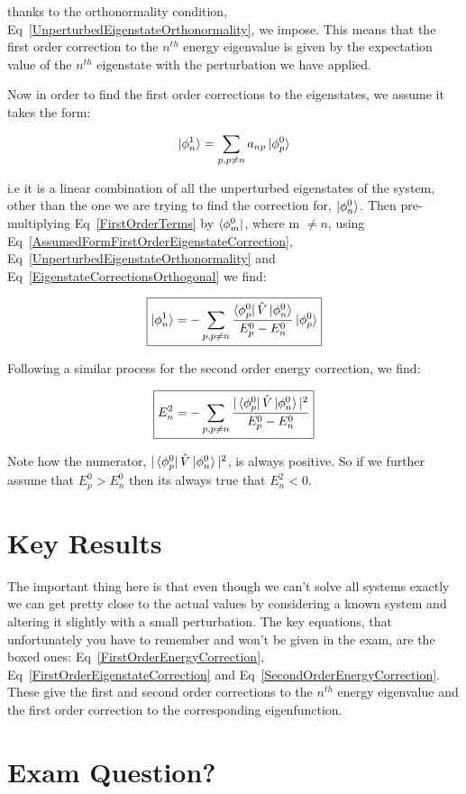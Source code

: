 \noindent thanks to the orthonormality condition, Eq~\ref{UnperturbedEigenstateOrthonormality}, we impose. This means that the first order correction to the $n^{th}$ energy eigenvalue is given by the expectation value of the $n^{th}$ eigenstate with the perturbation we have applied.

\noindent Now in order to find the first order corrections to the eigenstates, we assume it takes the form:

\begin{equation}
    \ket{\phi^1_n} = \sum_{p, p \neq n} a_{np} \ket{\phi^0_p}
    \label{AssumedFormFirstOrderEigenstateCorrection}
\end{equation}

\noindent i.e it is a linear combination of all the unperturbed eigenstates of the system, other than the one we are trying to find the correction for, $\ket{\phi^0_n}$. Then pre-multiplying Eq~\ref{FirstOrderTerms} by $\bra{\phi^0_m}$, where m $\neq n$, using Eq~\ref{AssumedFormFirstOrderEigenstateCorrection}, Eq~\ref{UnperturbedEigenstateOrthonormality} and Eq~\ref{EigenstateCorrectionsOrthogonal} we find:

\begin{equation}
    \boxed{\ket{\phi^1_n} = - \sum_{p, p \neq n} \frac{\bra{\phi^0_p}  \Hat{V}  \ket{\phi^0_n}}{{E^0_p - E^0_n}} \ket{\phi^0_p}}
    \label{FirstOrderEigenstateCorrection}
\end{equation}

\noindent Following a similar process for the second order energy correction, we find:

\begin{equation}
    \boxed{E^2_n = - \sum_{p, p \neq n} \frac{|\bra{\phi^0_p}  \Hat{V}  \ket{\phi^0_n}|^2}{{E^0_p - E^0_n}}}
    \label{SecondOrderEnergyCorrection}
\end{equation}

\noindent Note how the numerator, $|\bra{\phi^0_p}  \Hat{V}  \ket{\phi^0_n}|^2$, is always positive. So if we further assume that $E^0_p > E^0_n$ then its always true that $E^2_n < 0$.

\section{Key Results}

The important thing here is that even though we can't solve all systems exactly we can get pretty close to the actual values by considering a known system and altering it slightly with a small perturbation. The key equations, that unfortunately you have to remember and won't be given in the exam, are the boxed ones: Eq~\ref{FirstOrderEnergyCorrection}, Eq~\ref{FirstOrderEigenstateCorrection} and Eq~\ref{SecondOrderEnergyCorrection}. These give the first and second order corrections to the $n^{th}$ energy eigenvalue and the first order correction to the corresponding eigenfunction.


\section{Exam Question?}




